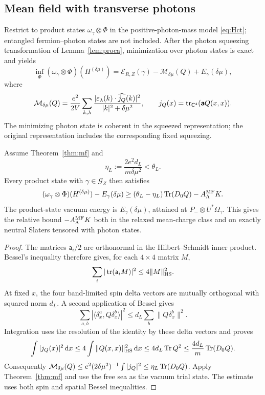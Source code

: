 \subsection{Mean field with transverse photons}
\label{subsec:mf-photons}

Restrict to product states $\omega_\gamma\otimes\Phi$ in the
positive-photon-mass model \eqref{eq:Hct}; entangled fermion--photon states
are not included.  After the photon squeezing transformation of
Lemma~\ref{lem:proca}, minimization over photon states is exact and yields
\begin{equation}
 \inf_\Phi(\omega_\gamma\otimes\Phi)(H^{(\delta\mu)})
 =\mathcal E_{R,Z}(\gamma)-\mathcal M_{\delta\mu}(Q)
       +E_\gamma(\delta\mu),
 \label{eq:mf-photon}
\end{equation}
where
\[
 \mathcal M_{\delta\mu}(Q)
 =\frac{e^2}{2V}\sum_{k,\lambda}
       \frac{|\varepsilon_\lambda(k)\cdot\widehat{j_Q}(k)|^2}
            {|k|^2+\delta\mu^2},
 \qquad
 j_Q(x)=\operatorname{tr}_{\mathbb C^4}(\boldsymbol{\mathsf a}Q(x,x)).
\]
The minimizing photon state is coherent in the squeezed representation;
the original representation includes the corresponding fixed squeezing.

\begin{proposition}
\label{prop:mf-heavy}
Assume Theorem~\ref{thm:mf} and
\[
 \eta_L:=\frac{2e^2d_L}{m\delta\mu^2}<\theta_L.
\]
Every product state with $\gamma\in\mathcal G_Z$ then satisfies
\[
 (\omega_\gamma\otimes\Phi)(H^{(\delta\mu)})-E_\gamma(\delta\mu)
 \ge(\theta_L-\eta_L)\operatorname{Tr}(D_0Q)-A^{\rm MF}_\Lambda K.
\]
The product-state vacuum energy is $E_\gamma(\delta\mu)$, attained at
$P_-\otimes U^*\Omega_\gamma$.  This gives the relative bound $-A^{\rm MF}_\Lambda K$
both in the relaxed mean-charge class and on exactly neutral Slaters
tensored with photon states.
\end{proposition}
\begin{proof}
The matrices $\mathsf a_i/2$ are orthonormal in the Hilbert--Schmidt inner
product.  Bessel's inequality therefore gives, for each $4\times4$ matrix $M$,
\[
 \sum_i|\operatorname{tr}(\mathsf a_iM)|^2\le4\|M\|_{\mathrm{HS}}^2.
\]
At fixed $x$, the four band-limited spin delta vectors are mutually
orthogonal with squared norm $d_L$.  A second application of Bessel gives
\[
 \sum_{a,b}|\langle\delta_x^a,Q\delta_x^b\rangle|^2
 \le d_L\sum_b\|Q\delta_x^b\|^2.
\]
Integration uses the resolution of the identity by these delta vectors and
proves
\[
 \int|j_Q(x)|^2\,\mathrm d x
 \le4\int\|Q(x,x)\|_{\mathrm{HS}}^2\,\mathrm d x
 \le4d_L\operatorname{Tr} Q^2
 \le\frac{4d_L}{m}\operatorname{Tr}(D_0Q).
\]
Consequently
$\mathcal M_{\delta\mu}(Q)\le
e^2(2\delta\mu^2)^{-1}\int|j_Q|^2\le\eta_L\operatorname{Tr}(D_0Q)$.
Apply Theorem~\ref{thm:mf} and use the free sea as the vacuum trial state.
The estimate uses both spin and spatial Bessel inequalities.
\end{proof}

